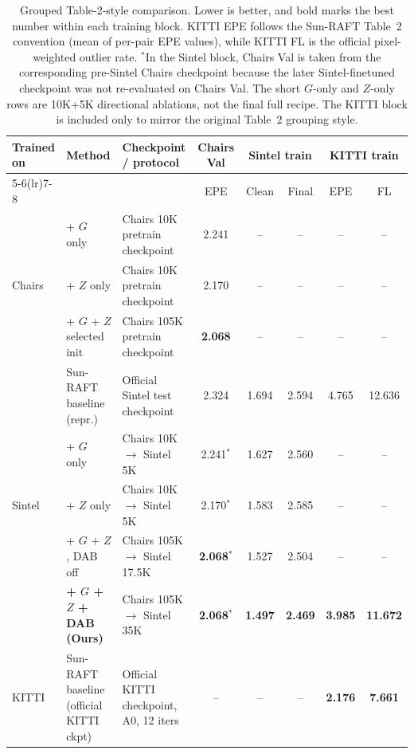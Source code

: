 \begin{table}[t]
\centering
\small
\setlength{\tabcolsep}{4.2pt}
\begin{tabular}{llp{4.2cm}ccccc}
\toprule
Trained on & Method & Checkpoint / protocol & Chairs Val & \multicolumn{2}{c}{Sintel train} & \multicolumn{2}{c}{KITTI train} \\
\cmidrule(lr){5-6}\cmidrule(lr){7-8}
 & & & EPE & Clean & Final & EPE & FL \\
\midrule
\multirow{3}{*}{Chairs}
& + $G$ only & Chairs 10K pretrain checkpoint & 2.241 & -- & -- & -- & -- \\
& + $Z$ only & Chairs 10K pretrain checkpoint & 2.170 & -- & -- & -- & -- \\
& + $G$ + $Z$ selected init & Chairs 105K pretrain checkpoint & \textbf{2.068} & -- & -- & -- & -- \\
\midrule
\multirow{5}{*}{Sintel}
& Sun-RAFT baseline (repr.) & Official Sintel test checkpoint & 2.324 & 1.694 & 2.594 & 4.765 & 12.636 \\
& + $G$ only & Chairs 10K $\rightarrow$ Sintel 5K & 2.241$^{*}$ & 1.627 & 2.560 & -- & -- \\
& + $Z$ only & Chairs 10K $\rightarrow$ Sintel 5K & 2.170$^{*}$ & 1.583 & 2.585 & -- & -- \\
& + $G$ + $Z$, DAB off & Chairs 105K $\rightarrow$ Sintel 17.5K & \textbf{2.068}$^{*}$ & 1.527 & 2.504 & -- & -- \\
& \textbf{+ $G$ + $Z$ + DAB (Ours)} & Chairs 105K $\rightarrow$ Sintel 35K & \textbf{2.068}$^{*}$ & \textbf{1.497} & \textbf{2.469} & \textbf{3.985} & \textbf{11.672} \\
\midrule
\multirow{1}{*}{KITTI}
& Sun-RAFT baseline (official KITTI ckpt) & Official KITTI checkpoint, A0, 12 iters & -- & -- & -- & \textbf{2.176} & \textbf{7.661} \\
\bottomrule
\end{tabular}
\caption{
Grouped Table-2-style comparison. Lower is better, and bold marks the best number within each training block. KITTI EPE follows the Sun-RAFT Table~2 convention (mean of per-pair EPE values), while KITTI FL is the official pixel-weighted outlier rate. $^{*}$In the Sintel block, Chairs Val is taken from the corresponding pre-Sintel Chairs checkpoint because the later Sintel-finetuned checkpoint was not re-evaluated on Chairs Val. The short $G$-only and $Z$-only rows are 10K+5K directional ablations, not the final full recipe. The KITTI block is included only to mirror the original Table~2 grouping style.
}
\label{tab:table2_style_results}
\end{table}

